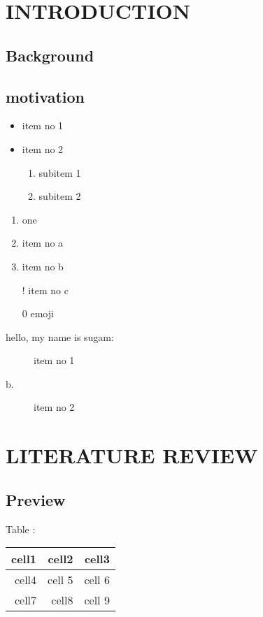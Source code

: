 \documentclass{report}
\begin{document}
\tableofcontents
{}

\chapter{INTRODUCTION}
\section*{Background}
\lipsum[1-2]
\section{motivation}
\lipsum[1-2]
\begin{itemize}
    \item item no 1
    \item item no 2
    \begin{enumerate}
        \item subitem 1
        \item subitem 2
    \end{enumerate}
\end{itemize}
\begin{enumerate}
\item one
    \item item no a
    \item item no b
    \item[!] item no c
    \item[0] emoji
\end{enumerate}
\begin{description}
    \item[hello, my name is sugam:] item no 1
    \item[b.] item no 2
\end{description}
    
\chapter{LITERATURE REVIEW}
\lipsum[1-2]
\section{Preview}
\lipsum[1-2]
    \par
    Table :

\begin{center}
    \begin{tabular}
    {|r|r|r|}
    \hline
        cell1 & cell2 & cell3 \\
        \hline
        cell4 & cell 5 & cell 6\\
        \hline
        cell7 & cell8 & cell 9 \\
    \hline
    \end{tabular}
\end{center}
\end{document}
